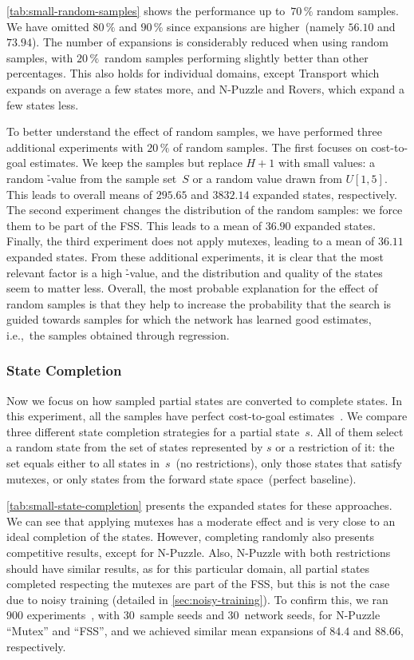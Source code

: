 \cref{tab:small-random-samples} shows the performance up to~$70\,\%$ random samples. We have omitted $80\,\%$ and $90\,\%$ since expansions are higher~(namely $56.10$ and $73.94$). The number of expansions is considerably reduced when using random samples, with $20\,\%$~random samples performing slightly better than other percentages. This also holds for individual domains, except Transport which expands on average a few states more, and N-Puzzle and Rovers, which expand a few states less.

To better understand the effect of random samples, we have performed three additional experiments with $20\,\%$ of random samples. The first focuses on cost-to-goal estimates. We keep the samples but replace $H+1$ with small values: a random \h-value from the sample set~$S$ or a random value drawn from $U[1,5]$. This leads to overall means of $295.65$ and $3832.14$ expanded states, respectively. The second experiment changes the distribution of the random samples: we force them to be part of the FSS. This leads to a mean of $36.90$ expanded states. Finally, the third experiment does not apply mutexes, leading to a mean of $36.11$ expanded states. From these additional experiments, it is clear that the most relevant factor is a high \h-value, and the distribution and quality of the states seem to matter less. Overall, the most probable explanation for the effect of random samples is that they help to increase the probability that the search is guided towards samples for which the network has learned good estimates, i.e.,~the samples obtained through regression.

\subsubsection{State Completion}
\label{sec:small-exps-state-completion}

Now we focus on how sampled partial states are converted to complete states. In this experiment, all the samples have perfect cost-to-goal estimates~\hstar. We compare three different state completion strategies for a partial state~$s$. All of them select a random state from the set of states represented by $s$ or a restriction of it: the set equals either to all states in~$s$~(no restrictions), only those states that satisfy mutexes, or only states from the forward state space~(perfect baseline).

\cref{tab:small-state-completion} presents the expanded states for these approaches. We can see that applying mutexes has a moderate effect and is very close to an ideal completion of the states. However, completing randomly also presents competitive results, except for N-Puzzle. Also, N-Puzzle with both restrictions should have similar results, as for this particular domain, all partial states completed respecting the mutexes are part of the FSS, but this is not the case due to noisy training (detailed in \cref{sec:noisy-training}). To confirm this, we ran $900$ experiments~, with $30$~sample seeds and $30$~network seeds, for N-Puzzle ``Mutex'' and ``FSS'', and we achieved similar mean expansions of $84.4$ and $88.66$, respectively.

